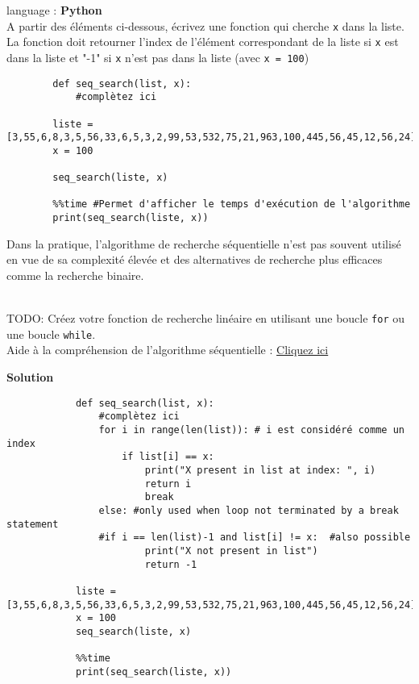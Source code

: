 \begin{Exercice}[5 minutes] language : \textbf{Python}\\

A partir des éléments ci-dessous, écrivez une fonction qui cherche \lstinline{x} dans la liste.\\La fonction doit retourner l'index de l'élément correspondant de la liste si \lstinline{x} est dans la liste et "-1" si \lstinline{x} n'est pas dans la liste (avec \lstinline{x = 100})\\

    \begin{lstlisting}
        def seq_search(list, x):
            #complètez ici
            
        liste = [3,55,6,8,3,5,56,33,6,5,3,2,99,53,532,75,21,963,100,445,56,45,12,56,24]
        x = 100
        
        seq_search(liste, x)
        
        %%time #Permet d'afficher le temps d'exécution de l'algorithme 
        print(seq_search(liste, x))
    \end{lstlisting}

Dans la pratique, l'algorithme de recherche séquentielle n'est pas souvent utilisé en vue de sa complexité élevée et des alternatives de recherche plus efficaces comme la recherche binaire.\\\\

    \begin{conseil}
        TODO: Créez votre fonction de recherche linéaire en utilisant une boucle \lstinline{for} ou une boucle \lstinline{while}.\\
        Aide à la compréhension de l'algorithme séquentielle : \href{https://runestone.academy/runestone/books/published/pythonds/SortSearch/TheSequentialSearch.html#lst-seqsearchpython}{Cliquez ici}
    \end{conseil}
    
    \begin{solution}
            
    \end{solution}
\textbf{Solution}
    \begin{lstlisting}
            def seq_search(list, x):
                #complètez ici
                for i in range(len(list)): # i est considéré comme un index
                    if list[i] == x:
                        print("X present in list at index: ", i)
                        return i
                        break
                else: #only used when loop not terminated by a break statement
                #if i == len(list)-1 and list[i] != x:  #also possible
                        print("X not present in list")
                        return -1
            
            liste = [3,55,6,8,3,5,56,33,6,5,3,2,99,53,532,75,21,963,100,445,56,45,12,56,24]
            x = 100
            seq_search(liste, x)
            
            %%time 
            print(seq_search(liste, x))
    \end{lstlisting}  
\end{Exercice}

